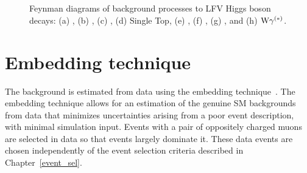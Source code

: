 \begin{figure}[htbp!]
  \hspace{0.5cm}
  \\
  \vspace{1cm}
  \hspace{0.5cm}
  \\
  \caption{Feynman diagrams of background processes to LFV Higgs boson decays: (a) \Htt, (b) \Ztt, (c) \ttbar, (d) Single Top, (e) \PW{}\PW, (f) \PW{}\PZ, (g) \PZ{}\PZ, and (h) $\text{W}\gamma^{(\ast)}$.}
  \label{fig:feynman_bkg}
\end{figure}

\section{Embedding technique}
The \Ztt background is estimated from data using the embedding technique~\cite{Sirunyan:2019drn}. The embedding technique allows for an estimation of the genuine \Pgt{}\Pgt SM backgrounds from data that minimizes uncertainties arising from a poor event description, with minimal simulation input. Events with a pair of oppositely charged muons are selected in data so that \Zmm events largely dominate it. These data events are chosen independently of the event selection criteria described in Chapter~\ref{event_sel}.

